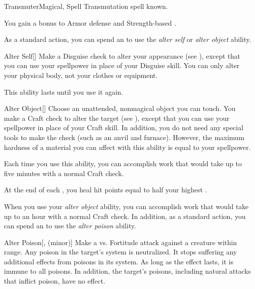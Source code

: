     \begin{feat}{Transmuter}{Magical, Spell}
        \featpre Transmutation spell known.

         You gain a  bonus to Armor defense and Strength-based .

         As a standard action, you can spend an  to use the \textit{alter self} or \textit{alter object} ability.
        \begin{ability}{Alter Self}[]
            Make a Disguise check to alter your appearance (see ), except that you can use your spellpower in place of your Disguise skill.
            You can only alter your physical body, not your clothes or equipment.

            This ability lasts until you use it again.
        \end{ability}

        \begin{ability}{Alter Object}[]
            Choose an unattended, nonmagical object you can touch.
            You make a Craft check to alter the target (see ), except that you can use your spellpower in place of your Craft skill.
            In addition, you do not need any special tools to make the check (such as an anvil and furnace).
            However, the maximum hardness of a material you can affect with this ability is equal to your spellpower.

            Each time you use this ability, you can accomplish work that would take up to five minutes with a normal Craft check.
        \end{ability}

         At the end of each , you heal hit points equal to half your highest .

         When you use your \textit{alter object} ability, you can accomplish work that would take up to an hour with a normal Craft check.
        In addition, as a standard action, you can spend an  to use the \textit{alter poison} ability.
        \begin{ability}{Alter Poison}[,  (minor)]
            Make a  vs. Fortitude attack against a creature within \rngclose range.
            \hit Any poison in the target's system is neutralized.
            It stops suffering any additional effects from poisons in its system.
            As long as the effect lasts, it is immune to all poisons.
            In addition, the target's  poisons, including natural attacks that inflict poison, have no effect.
        \end{ability}


\end{feat}
